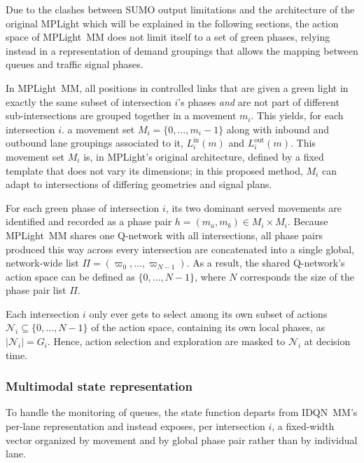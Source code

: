 Due to the clashes between SUMO output limitations and the architecture of the original MPLight which will be explained in the following sections, the action space of MPLight~MM does not limit itself to a set of green phases, relying instead in a representation of demand groupings that allows the mapping between queues and traffic signal phases.

\medskip 

\noindent In MPLight~MM, all positions in controlled links that are given a green light in exactly the same subset of intersection $i$'s phases \textit{and} are not part of different sub-intersections are grouped together in a movement $m_i$. This yields, for each intersection $i$. a movement set $M_i =\{0,\dots,m_i-1\}$ along with inbound and outbound lane groupings associated to it, $L_i^{\text{in}}(m)$ and $L_i^{\text{out}}(m)$. This movement set $M_i$ is, in MPLight's original architecture, defined by a fixed template that does not vary its dimensions; in this proposed method, $M_i$ can adapt to intersections of differing geometries and signal plans.
 
For each green phase of intersection $i$, its two dominant served movements are identified and recorded as a phase pair $h = (m_a, m_b) \in M_i \times {M_i}$. Because MPLight~MM shares one Q-network with all intersections, all phase pairs produced this way across every intersection are concatenated into a single global, network-wide list $\Pi = (\varpi_0, \dots, \varpi_{N-1})$. As a result, the shared Q-network's action space can be defined as $\{0,\dots,N-1\}$, where $N$ corresponds the size of the phase pair list $\Pi$.

Each intersection $i$ only ever gets to select among its own subset of actions $\mathcal{N}_i \subseteq \{0,\dots,N-1\}$ of the action space, containing its own local phases, as $|\mathcal{N}_i| = G_i$. Hence, action selection and exploration are masked to $\mathcal{N}_i$ at decision time.
 
\subsubsection{Multimodal state representation} \label{subsubsec:mp_state}
 
To handle the monitoring of queues, the state function departs from IDQN~MM's per-lane representation and instead exposes, per intersection $i$, a fixed-width vector organized by movement and by global phase pair rather than by individual lane. 

